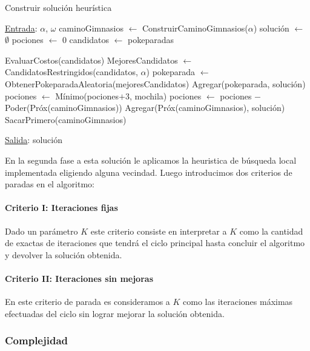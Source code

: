 \begin{algorithm}[H]

\label{}
\caption{Construir soluci\'on heur\'istica}

\begin{algorithmic}[1]

\Statex \underline{Entrada}: $\alpha$, $\omega$
\medskip
\State caminoGimnasios $\gets$ ConstruirCaminoGimnasios($\alpha$)
\State soluci\'on $\gets$ $\emptyset$
\State pociones $\gets$ $0$
\State candidatos $\gets$ pokeparadas

		\State EvaluarCostos(candidatos)
		\State MejoresCandidatos $\gets$ CandidatosRestringidos(candidatos, $\alpha$)
		\State pokeparada $\gets$ ObtenerPokeparadaAleatoria(mejoresCandidatos)
		\State Agregar(pokeparada, soluci\'on)
		\State pociones $\gets$ M\'inimo(pociones$+3$, mochila)
	\EndWhile
	\State pociones $\gets$  pociones $-$ Poder(Pr\'ox(caminoGimnasios))
	\State  Agregar(Pr\'ox(caminoGimnasios), soluci\'on)
	\State  SacarPrimero(caminoGimnasios)
\EndWhile

\medskip
\Statex \underline{Salida}: soluci\'on

\end{algorithmic}
\end{algorithm}

En la segunda fase a esta solución le aplicamos la heuristica de búsqueda local implementada eligiendo alguna vecindad. Luego introducimos dos criterios de paradas en el algoritmo:

\paragraph{Criterio I: Iteraciones fijas}
Dado un parámetro $K$ este criterio consiste en interpretar a $K$ como la cantidad de exactas de iteraciones que tendrá el ciclo principal hasta concluir el algoritmo y devolver la solución obtenida.

\paragraph{Criterio II: Iteraciones sin mejoras}
En este criterio de parada es consideramos a $K$ como las iteraciones máximas efectuadas del ciclo sin lograr mejorar la solución obtenida.


\subsubsection{Complejidad}

